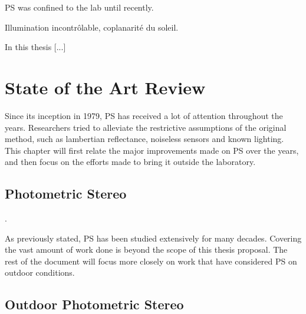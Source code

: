 \documentclass{report}
\begin{document}
PS was confined to the lab until recently.

Illumination incontrôlable, coplanarité du soleil.

In this thesis [...]


\chapter{State of the Art Review}


Since its inception in 1979, PS has received a lot of attention throughout the years. Researchers tried to alleviate the restrictive assumptions of the original method, such as lambertian reflectance, noiseless sensors and known lighting. This chapter will first relate the major improvements made on PS over the years, and then focus on the efforts made to bring it outside the laboratory.

\section{Photometric Stereo}

\cite{basri-ijcv-2007,BarskyPetrou-pami-2003,alldrin-cvpr-08,ikehata-cvpr-12,ikehata-cvpr-14}.

As previously stated, PS has been studied extensively for many decades. Covering the vast amount of work done is beyond the scope of this thesis proposal. The rest of the document will focus more closely on work that have considered PS on outdoor conditions.

\section{Outdoor Photometric Stereo}
\end{document}
